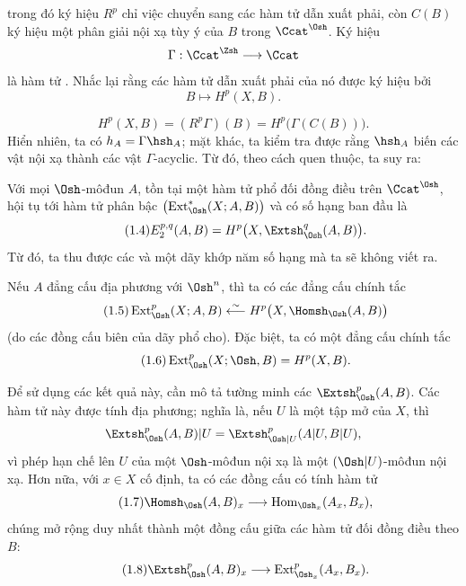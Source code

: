 trong đó ký hiệu $R^{p}$ chỉ việc chuyển sang các hàm tử dẫn xuất phải, còn
$C(B)$ ký hiệu một phân giải nội xạ tùy ý của $B$ trong $\Ccat^{\Osh}$.
Ký hiệu
\[
  \Gamma:\Ccat^{\Zsh}\longrightarrow\Ccat
\]
là hàm tử . Nhắc lại rằng các hàm tử dẫn xuất phải của nó được
ký hiệu bởi
\[
  B\longmapsto H^{p}(X,B).
\]

\begin{equation}\tag{1.3}
  H^{p}(X,B)=(R^{p}\Gamma)(B)=H^{p}\bigl(\Gamma(C(B))\bigr).
\end{equation}
Hiển nhiên, ta có $h_A=\Gamma\hsh_A$; mặt khác, ta kiểm tra được rằng $\hsh_A$
biến các vật nội xạ thành các vật $\Gamma$-acyclic. Từ đó, theo cách quen thuộc,
ta suy ra:

 Với mọi $\Osh$-môđun $A$, tồn tại một hàm tử
phổ đối đồng điều trên $\Ccat^{\Osh}$, hội tụ tới hàm tử phân bậc
$\bigl(\operatorname{Ext}_{\Osh}^{*}(X;A,B)\bigr)$ và có số hạng ban đầu là
\begin{equation}\tag{1.4}
  E_{2}^{p,q}(A,B)=H^{p}\bigl(X,\Extsh_{\Osh}^{q}(A,B)\bigr).
\end{equation}
Từ đó, ta thu được các  và một dãy khớp năm số hạng
mà ta sẽ không viết ra.

 Nếu $A$ đẳng cấu địa phương với $\Osh^{n}$, thì ta có
các đẳng cấu chính tắc
\begin{equation}\tag{1.5}
  \operatorname{Ext}_{\Osh}^{p}(X;A,B)
  \overset{\sim}{\longleftarrow}
  H^{p}\bigl(X,\Homsh_{\Osh}(A,B)\bigr)
\end{equation}
(do các đồng cấu biên của dãy phổ cho). Đặc biệt, ta có
một đẳng cấu chính tắc
\begin{equation}\tag{1.6}
  \operatorname{Ext}_{\Osh}^{p}(X;\Osh,B)=H^{p}(X,B).
\end{equation}

Để sử dụng các kết quả này, cần mô tả tường minh các
$\Extsh_{\Osh}^{p}(A,B)$. Các hàm tử này được tính địa phương;
nghĩa là, nếu $U$ là một tập mở của $X$, thì
\[
  \Extsh_{\Osh}^{p}(A,B)|U
  =\Extsh_{\Osh|U}^{p}(A|U,B|U),
\]
vì phép hạn chế lên $U$ của một $\Osh$-môđun nội xạ
là một $(\Osh|U)$-môđun nội xạ. Hơn nữa, với $x\in X$ cố định, ta có các đồng cấu có tính hàm tử
\begin{equation}\tag{1.7}
  \Homsh_{\Osh}(A,B)_x
  \longrightarrow
  \operatorname{Hom}_{\Osh_x}(A_x,B_x),
\end{equation}
chúng mở rộng duy nhất thành một đồng cấu giữa các hàm tử đối đồng điều
theo $B$:
\begin{equation}\tag{1.8}
  \Extsh_{\Osh}^{p}(A,B)_x
  \longrightarrow
  \operatorname{Ext}_{\Osh_x}^{p}(A_x,B_x).
\end{equation}

